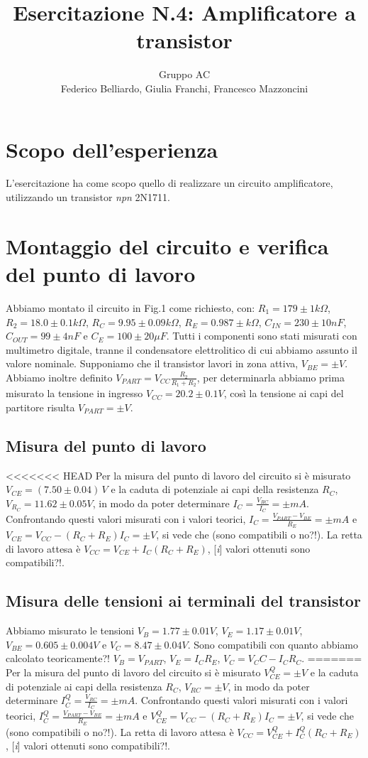 \documentclass[10pt,a4paper]{article}
\author{Gruppo AC \\ Federico Belliardo, Giulia Franchi, Francesco Mazzoncini}
\title{Esercitazione N.4: Amplificatore a transistor}
\newcommand{\rem}[1]{[\emph{#1}]}
\begin{document}
\maketitle

\section{Scopo dell'esperienza}
L'esercitazione ha come scopo quello di realizzare un circuito amplificatore, utilizzando un transistor \textit{npn} 2N1711.

\section{Montaggio del circuito e verifica del punto di lavoro}
Abbiamo montato il circuito in Fig.1 come richiesto, con: $R_1= 179\pm1  k\Omega$, $R_2= 18.0\pm0.1  k\Omega$, $R_C= 9.95\pm 0.09  k\Omega$, $R_E= 0.987\pm  k\Omega$, $C_{IN}= 230\pm10  nF$, $C_{OUT}= 99\pm4  nF$ e $C_E= 100\pm20  \mu F$. Tutti i componenti sono stati misurati con multimetro digitale, tranne il condensatore elettrolitico di cui abbiamo assunto il valore nominale.
Supponiamo che il transistor lavori in zona attiva, $V_{BE}= \pm V$. Abbiamo inoltre definito $V_{PART}=V_{CC}\frac{R_2}{R_1+R_2}$, per determinarla abbiamo prima misurato la tensione in ingresso $V_{CC}= 20.2\pm0.1 V$, così la tensione ai capi del partitore risulta $V_{PART}= \pm V$.


\subsection{Misura del punto di lavoro}
<<<<<<< HEAD
Per la misura del punto di lavoro del circuito si è misurato $V_{CE}= (7.50\pm0.04)\,V$ e la caduta di potenziale ai capi della resistenza $R_C$, $V_{R_C}= 11.62\pm0.05  V$, in modo da poter determinare $I_C=\frac{V_{RC}}{I_C}= \pm mA$.
Confrontando questi valori misurati con i valori teorici, $I_C=\frac{V_{PART}-V_{BE}}{R_E}= \pm mA$ e $V_{CE}=V_{CC}-(R_C+R_E)I_C= \pm V$, si vede che (sono compatibili o no?!).
La retta di lavoro attesa è $V_{CC}=V_{CE}+I_C(R_C+R_E)$, \rem i valori ottenuti sono compatibili?!.

\subsection{Misura delle tensioni ai terminali del transistor}
Abbiamo misurato le tensioni $V_B= 1.77\pm0.01  V$, $V_E= 1.17\pm0.01 V$, $V_{BE}= 0.605\pm0.004  V$ e $V_C= 8.47\pm0.04 V$. Sono compatibili con quanto abbiamo calcolato teoricamente?! $V_B= V_{PART}$, $V_E=I_C R_E$, $V_C=V_CC-I_C R_C$.
=======
Per la misura del punto di lavoro del circuito si è misurato $V_{CE}^Q= \pm V$ e la caduta di potenziale ai capi della resistenza $R_C$, $V_{RC}= \pm V$, in modo da poter determinare $I_C^Q=\frac{V_{RC}}{I_C}= \pm mA$. Confrontando questi valori misurati con i valori teorici, $I_C^Q=\frac{V_{PART}-V_{BE}}{R_E}= \pm mA$ e $V_{CE}^Q=V_{CC}-(R_C+R_E)I_C= \pm V$, si vede che (sono compatibili o no?!).
La retta di lavoro attesa è $V_{CC}=V_{CE}^Q+I_C^Q(R_C+R_E)$, \rem i valori ottenuti sono compatibili?!.
\end{document}
